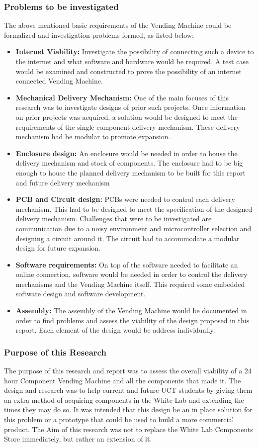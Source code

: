 \documentclass[a4paper,11pt]{article}
\numberwithin{figure}{section}
\numberwithin{table}{section}
\begin{document}
		\subsubsection{Problems to be investigated}
The above mentioned basic requirements of the Vending Machine could be formalized and investigation problems formed, as listed below:
\begin{itemize}
\item \textbf{Internet Viability:} Investigate the possibility of connecting such a device to the internet and what software and hardware would be required. A test case would be examined and constructed to prove the possibility of an internet connected Vending Machine.
\item \textbf{Mechanical Delivery Mechanism:} One of the main focuses of this research was to investigate designs of prior such projects. Once information on prior projects was acquired, a solution would be designed to meet the requirements of the single component delivery mechanism. These delivery mechanism had be modular to promote expansion.
\item \textbf{Enclosure design:} An enclosure would be needed in order to house the delivery mechanism and stock of components. The enclosure had to be big enough to house the planned delivery mechanism to be built for this report and future delivery mechanism
\item \textbf{PCB and Circuit design:} PCBs were needed to control each delivery mechanism. This had to be designed to meet the specification of the designed delivery mechanism. Challenges that were to be investigated are communication due to a noisy environment and microcontroller selection and designing a circuit around it. The circuit had to accommodate a modular design for future expansion.
\item \textbf{Software requirements:} On top of the software needed to facilitate an online connection, software would be needed in order to control the delivery mechanisms and the Vending Machine itself. This required some embedded software design and software development. 
\item \textbf{Assembly:} The assembly of the Vending Machine would be documented in order to find problems and assess the viability of the design proposed in this report. Each element of the design would be address individually.
\end{itemize}
		\subsubsection{Purpose of this Research}
The purpose of this research and report was to assess the overall viability of a 24 hour Component Vending Machine and all the components that made it. The design and research was to help current and future UCT students by giving them an extra method of acquiring components in the White Lab and extending the times they may do so. It was intended that this design be an in place solution for this problem or a prototype that could be used to build a more commercial product. The Aim of this research was not to replace the White Lab Components Store immediately, but rather an extension of it.
\end{document}
